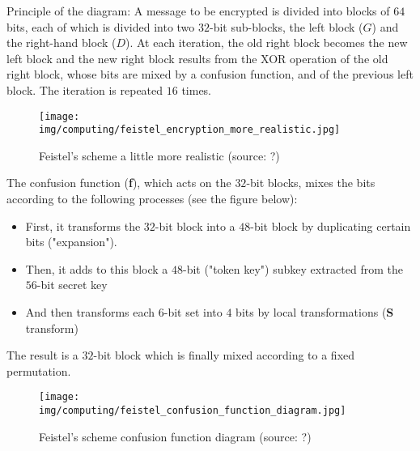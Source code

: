 	Principle of the diagram: A message to be encrypted is divided into blocks of $64$ bits, each of which is divided into two $32$-bit sub-blocks, the left block ($G$) and the right-hand block ($D$). At each iteration, the old right block becomes the new left block and the new right block results from the XOR operation of the old right block, whose bits are mixed by a confusion function, and of the previous left block. The iteration is repeated $16$ times.
	\begin{figure}[H]
		\centering
		\texttt{[image: img/computing/feistel\_encryption\_more\_realistic.jpg]}
		\caption[Feistel's scheme]{Feistel's scheme a little more realistic (source: ?)}
	\end{figure}
	The confusion function (\textbf{f}), which acts on the $32$-bit blocks, mixes the bits according to the following processes (see the figure below):
	\begin{itemize}
		\item First, it transforms the $32$-bit block into a $48$-bit block by duplicating certain bits ("expansion"). 

		\item Then, it adds to this block a $48$-bit ("token key") subkey extracted from the $56$-bit secret key 

		\item And then transforms each $6$-bit set into $4$ bits by local transformations (\textbf{S} transform)
	\end{itemize}
	The result is a $32$-bit block which is finally mixed according to a fixed permutation.
	
	\begin{figure}[H]
		\centering
		\texttt{[image: img/computing/feistel\_confusion\_function\_diagram.jpg]}
		\caption[Feistel's scheme confusion function diagram]{Feistel's scheme confusion function diagram (source: ?)}
	\end{figure}
	
	\pagebreak
